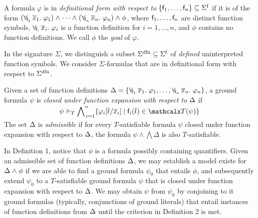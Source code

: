 \begin{definition}\rm
A formula $\varphi$ is in \emph{definitional form with respect to}
$\{ \con{f}_1, \dotsc, \con{f}_n \} \subseteq \sfuns{\Sigma}$ if it is of the
form
%
%
$(\forallf{\con{f}_1} \vec x_1.\; \varphi_1) \wedge \cdots \wedge
(\forallf{\con{f}_n} \vec x_n.\; \varphi_n) \wedge \phi$,
%
where $\mathsf{f}_1, \dotsc, \mathsf{f}_n$ are distinct function symbols,
$\forall_{\!\mathsf{f}_i\:} \overline{x}_i.\; \varphi_i$ is a function definition
for $i = 1, \dotsc, n$,
%
and $\phi$ contains no function definitions.
We call $\phi$ the \emph{goal} of $\varphi$.
\end{definition}

In the signature $\Sigma$, we distinguish a subset $\sfundefs{\Sigma}
\subseteq \sfuns{\Sigma}$ of \emph{defined} uninterpreted function symbols.
We consider $\Sigma$-formulas that are in definitional form with respect to
$\sfundefs{\Sigma}$.

\begin{definition}\rm
Given a set of function definitions
$\DDD = \{ \forallf{\con{f}_1} \vec x_1.\; \varphi_1, \dotsc, \forallf{\con{f}_n} \vec x_n.\; \varphi_n \}$,
a ground formula $\psi$
is \emph{closed under function expansion with respect to $\DDD$} if
\[\psi \models_T \smash{\bigwedge\nolimits_{\,i=1}^{n} \{ \varphi_i[ \vec t / \vec x_i ] \mid \con{f}_i( \vec t ) \in \terms( \psi ) \}}\]
The set $\DDD$ is \emph{admissible} if for every $T$-satisfiable formula
$\psi$ closed under function expansion with respect to $\DDD$,
the formula
$\psi \wedge \bigwedge \Delta$ is also $T$-satisfiable.
\end{definition}

In Definition 1, notice that $\phi$ is a formula possibly containing quantifiers.
Given an admissible set of function definitions $\DDD$, 
we may establish a model exists for $\DDD \wedge \phi$ 
if we are able to find a ground formula $\psi_0$ that entails $\phi$,
and subsequently extend $\psi_0$ to a $T$-satisfiable ground formula $\psi$ that is closed under function expansion with respect to $\DDD$.
We may obtain $\psi$ from $\psi_0$ by conjoining to it ground formulas 
(typically, conjunctions of ground literals) that entail instances of function definitions from $\DDD$ until the criterion in Definition 2 is met.

